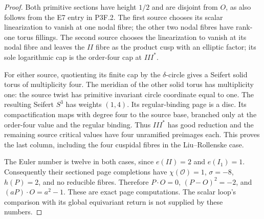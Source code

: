 \begin{proof}
Both primitive sections have height \(1/2\) and are disjoint from \(O\), as also follows from the E7 entry in P3F.2. The first source chooses its scalar linearization to vanish at one nodal fibre; the other two nodal fibres have rank-one torus fillings. The second source chooses the linearization to vanish at its nodal fibre and leaves the \(II\) fibre as the product cusp with an elliptic factor; its sole logarithmic cap is the order-four cap at \(III^*\).

For either source, quotienting its finite cap by the \(\delta\)-circle gives a Seifert solid torus of multiplicity four. The meridian of the other solid torus has multiplicity one: the source twist has primitive invariant circle coordinate equal to one. The resulting Seifert \(S^3\) has weights \((1,4)\). Its regular-binding page is a disc. Its compactification maps with degree four to the source base, branched only at the order-four value and the regular binding. Thus \(III^*\) has good reduction and the remaining source critical values have four unramified preimages each. This proves the last column, including the four cuspidal fibres in the Liu--Rollenske case.

The Euler number is twelve in both cases, since \(e(II)=2\) and \(e(I_1)=1\). Consequently their sectioned page completions have \(\chi(\mathcal O)=1\), \(\sigma=-8\), \(h(P)=2\), and no reducible fibres. Therefore \(P\cdot O=0\), \((P-O)^2=-2\), and \((aP)\cdot O=a^2-1\). These are exact page computations. The scalar loop's comparison with its global equivariant return is not supplied by these numbers.
\end{proof}
